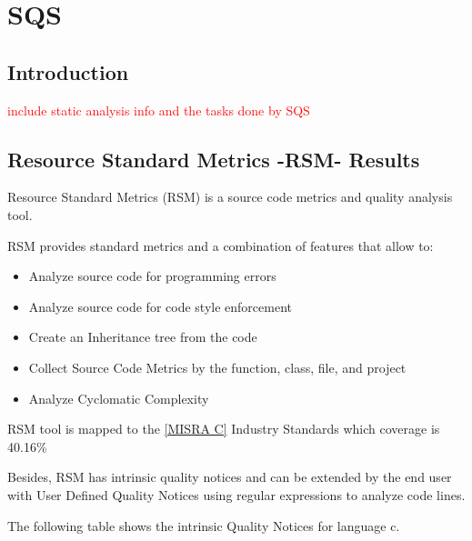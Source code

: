 
\section{SQS}
\label{sec:sqs}

\subsection{Introduction}
\textcolor{red}{include static analysis info and the tasks done by SQS}


\subsection{Resource Standard Metrics -RSM- Results}

Resource Standard Metrics (RSM) is a source code metrics and quality analysis tool.

RSM provides standard metrics and a combination of features that allow to:
\begin{itemize}
\item Analyze source code for programming errors
\item Analyze source code for code style enforcement
\item Create an Inheritance tree from the code
\item Collect Source Code Metrics by the function, class, file, and project
\item Analyze Cyclomatic Complexity
\end{itemize}

RSM tool is mapped to the \href{http://msquaredtechnologies.com/m2rsm/docs/QualityStandards/MISRA_C_Mapping.htm}{[MISRA C]} Industry Standards which coverage is 40.16\% 


Besides, RSM has intrinsic quality notices and can be extended by the end user with User Defined Quality Notices using regular expressions to analyze code lines. 

The following table shows the intrinsic Quality Notices for language c.

